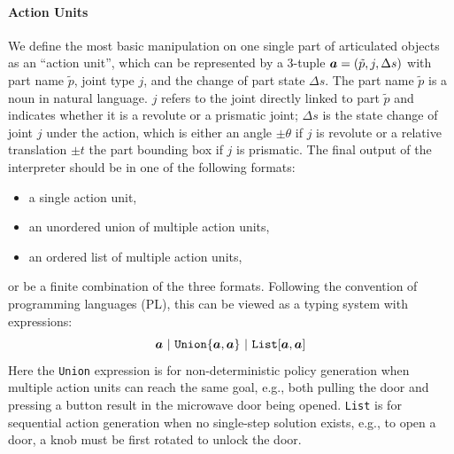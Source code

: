 \paragraph{Action Units}
\label{ssec:action_program}
We define the most basic manipulation on one single part of articulated objects as an ``action unit'', which can be represented by a 3-tuple ${\bm{a}} = (\tilde{p}, j, \Delta s)$ with part name $\tilde{p}$, joint type $j$, and the change of part state $\Delta s$.
The part name $\tilde{p}$ is a noun in natural language.
$j$ refers to the joint directly linked to part $\tilde{p}$ and indicates whether it is a revolute or a prismatic joint; $\Delta s$ is the state change of joint $j$ under the action, which is either an angle $\pm\theta$ if $j$ is revolute or a relative translation $\pm t$ \wrt the part bounding box if $j$ is prismatic.
%
The final output of the interpreter should be in one of the following formats:
\begin{itemize}
    \item a single action unit,
    \item an unordered union of multiple action units,
    \item an ordered list of multiple action units,
\end{itemize}
or be a finite combination of the three formats.
%
Following the convention of programming languages (PL), this can be viewed as a typing system with expressions:
\begin{equation*}
    {\bm{a}} ~|~ \texttt{Union}\{{\bm{a}},{\bm{a}}\} ~|~ \texttt{List}[{\bm{a}},{\bm{a}}]
\end{equation*}
Here the \texttt{Union} expression is for non-deterministic policy generation when multiple action units can reach the same goal, e.g., both pulling the door and pressing a button result in the microwave door being opened.
\texttt{List} is for sequential action generation when no single-step solution exists, e.g., to open a door, a knob must be first rotated to unlock the door.

